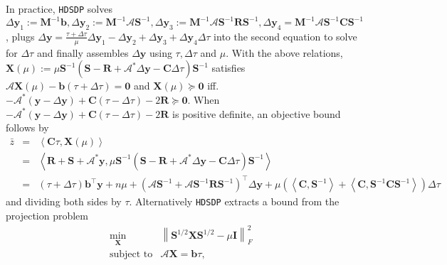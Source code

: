 In practice, {{\texttt{HDSDP}}} solves $\Delta \mathbf{y}_1 := \mathbf{M}^{- 1} \mathbf{b},
\Delta \mathbf{y}_2 := \mathbf{M}^{- 1} \mathcal{A} \mathbf{S}^{- 1}, \Delta \mathbf{y}_3 := \mathbf{M}^{- 1} \mathcal{A}
\mathbf{S}^{- 1} \mathbf{R} \mathbf{S}^{- 1}, \Delta \mathbf{y}_4 = \mathbf{M}^{- 1} \mathcal{A} \mathbf{S}^{- 1} \mathbf{C} \mathbf{S}^{-
1}$, plugs $\Delta \mathbf{y} = \frac{\tau + \Delta \tau}{\mu} \Delta \mathbf{y}_1 - \Delta
\mathbf{y}_2 + \Delta \mathbf{y}_3 + \Delta \mathbf{y}_4 \Delta \tau$ into the second equation to
solve for $\Delta \tau$ and finally assembles $\Delta \mathbf{y}$ using $\tau, \Delta
\tau$ and $\mu$. With the above relations, $\mathbf{X} (\mu) := \mu \mathbf{S}^{- 1}
\left( \mathbf{S} - \mathbf{R} +\mathcal{A}^{\ast} \Delta \mathbf{y} - \mathbf{C} \Delta \tau \right) \mathbf{S}^{-
1}$ satisfies $\mathcal{A} \mathbf{X} (\mu) - \mathbf{b} (\tau + \Delta \tau) = \textbf{0}$ and $\mathbf{X} (\mu)
\succeq \textbf{0}$ iff. $-\mathcal{A}^{\ast} \left( \mathbf{y} - \Delta \mathbf{y} \right) + \mathbf{C} (\tau
- \Delta \tau) - 2 \mathbf{R} \succeq \textbf{0}$. When $-\mathcal{A}^{\ast} \left( \mathbf{y} -
\Delta \mathbf{y} \right) + \mathbf{C} (\tau - \Delta \tau) - 2 \mathbf{R}$ is positive definite, an
objective bound follows by
\begin{eqnarray*}
  \bar{z} & = & \left\langle \mathbf{C} \tau, \mathbf{X} (\mu) \right\rangle\\
  & = & \left\langle \mathbf{R} + \mathbf{S} + \mathcal{A}^{\ast} \mathbf{y}, \mu \mathbf{S}^{- 1} \left( \mathbf{S} - \mathbf{R}
  +\mathcal{A}^{\ast} \Delta \mathbf{y} - \mathbf{C} \Delta \tau \right) \mathbf{S}^{- 1}
  \right\rangle\\
  & = & (\tau + \Delta \tau) \mathbf{b}^{\top} \mathbf{y} + n \mu + \left( \mathcal{A} \mathbf{S}^{- 1} +
  \mathcal{A} \mathbf{S}^{- 1} \mathbf{R} \mathbf{S}^{- 1} \right)^{\top} \Delta \mathbf{y} + \mu \left(
  \left\langle \mathbf{C}, \mathbf{S}^{- 1} \right\rangle + \left\langle \mathbf{C}, \mathbf{S}^{- 1} \mathbf{C}
  \mathbf{S}^{- 1} \right\rangle \right) \Delta \tau
\end{eqnarray*}
and dividing both sides by $\tau$. Alternatively {{\texttt{HDSDP}}} extracts a
bound from the projection problem
\begin{eqnarray*}
  \min_{\mathbf{X}} & \left\| \mathbf{S}^{1 / 2} \mathbf{X} \mathbf{S}^{1 / 2} - \mu \mathbf{I} \right\|_F^2 & \\
  \text{subject to} & \mathcal{A} \mathbf{X} = \mathbf{b} \tau, & 
\end{eqnarray*}
